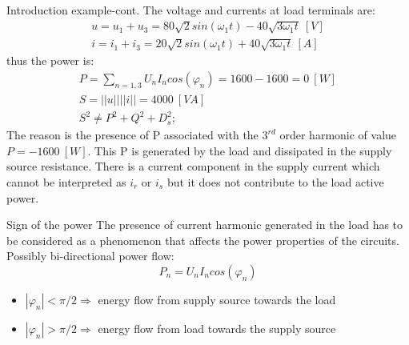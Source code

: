 \documentclass[aspectratio=169]{beamer}
\begin{document}
\begin{frame}{Introduction example-cont.}{\insertsection}
    The voltage and currents at load terminals are:
    \begin{gather}
      u=u_1+u_3 = 80\sqrt{2}sin(\omega_1t)-40\sqrt{3\omega_1t} \ \left[V\right]\\
      i=i_1+i_3 = 20\sqrt{2}sin(\omega_1t)+40\sqrt{3\omega_1t} \ \left[A\right]
    \end{gather}
    thus the power is: 
    \begin{gather}
      P=\sum_{n=1,3}U_nI_n cos(\varphi_n)=1600-1600=0 \ \left[W\right]\\
      S = ||u||||i|| = 4000 \ \left[VA\right]\\
      S^2 \ne P^2+Q^2+D_s^2;
    \end{gather}
    The reason is the presence of P associated with the $3^{rd}$ order harmonic of value $P=-1600\ \left[W\right]$. This P is generated by the load and dissipated in the supply source resistance. \textcolor{NTNU_orange}{There is a current component in the supply current which cannot be interpreted as $i_r$ or $i_s$ but it does not contribute to the load active power.}
  \end{frame}

  \begin{frame}{Sign of the power}{\insertsection}
    \textcolor{NTNU_orange}{The presence of current harmonic generated in the load has to be considered as a phenomenon that affects the power properties of the circuits.}\\
    Possibly bi-directional power flow:
    \begin{equation}
      P_n = U_nI_n cos(\varphi_n)
    \end{equation}
    \begin{itemize}
      \item $|\varphi_n|<\pi/2 \Rightarrow$ energy flow from \textcolor{NTNU_blue}{supply source} towards the \textcolor{NTNU_green}{load}
      \item $|\varphi_n| >\pi/2 \Rightarrow$ energy flow  from \textcolor{NTNU_green}{load} towards the \textcolor{NTNU_blue}{supply source}
    \end{itemize}
\end{frame}
\end{document}
